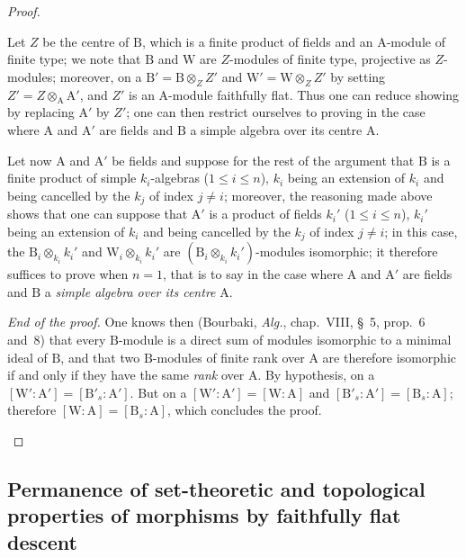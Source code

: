 \begin{proof}
\begin{env}[2.5.8.8]
Let $Z$ be the centre of $\mathrm{B}$, which is a finite product of fields and an $\mathrm{A}$-module of finite type; we note that $\mathrm{B}$ and $\mathrm{W}$ are
$Z$-modules of finite type, projective as $Z$-modules; moreover, on a $\mathrm{B}'=\mathrm{B}\otimes_Z Z'$ and $\mathrm{W}'=\mathrm{W}\otimes_Z Z'$ by setting
$Z'=Z\otimes_{\mathrm{A}}\mathrm{A}'$, and $Z'$ is an $\mathrm{A}$-module faithfully flat. Thus one can reduce showing  by replacing $\mathrm{A}'$ by $Z'$; one can then
restrict ourselves to proving  in the case where $\mathrm{A}$ and $\mathrm{A}'$ are fields and $\mathrm{B}$ a simple algebra over its centre $\mathrm{A}$.

Let now $\mathrm{A}$ and $\mathrm{A}'$ be fields and suppose for the rest of the argument that $\mathrm{B}$ is a finite product of simple $k_i$-algebras ($1\leq i\leq n$), $k_i$ being an extension of $k_i$ and being
cancelled by the $k_j$ of index $j\neq i$; moreover, the reasoning made above shows
that one can suppose that $\mathrm{A}'$ is a product of fields $k_i'$ ($1\leq i\leq n$), $k_i'$ being an extension of $k_i$ and being
cancelled by the $k_j$ of index $j\neq i$; in this case, the $\mathrm{B}_i\otimes_{k_i} k_i'$ and $\mathrm{W}_i\otimes_{k_i} k_i'$ are $(\mathrm{B}_i\otimes_{k_i} k_i')$-modules isomorphic; it therefore suffices to prove  when
$n=1$, that is to say in the case where $\mathrm{A}$ and $\mathrm{A}'$ are fields and $\mathrm{B}$ a \emph{simple algebra over its centre} $\mathrm{A}$.
\end{env}

\begin{env}[2.5.8.9]
\label{IV.2.5.8.9}
\emph{End of the proof.} One knows then (Bourbaki, \emph{Alg.}, chap.~VIII, \S~5, prop.~6 and~8) that every
$\mathrm{B}$-module is a direct sum of modules isomorphic to a minimal ideal of $\mathrm{B}$, and that two $\mathrm{B}$-modules of finite rank over
$\mathrm{A}$ are therefore isomorphic if and only if they have the same \emph{rank} over $\mathrm{A}$. By hypothesis, on a $[\mathrm{W}':\mathrm{A}']=[\mathrm{B}'_s:\mathrm{A}']$. But
on a $[\mathrm{W}':\mathrm{A}']=[\mathrm{W}:\mathrm{A}]$ and $[\mathrm{B}'_s:\mathrm{A}']= [\mathrm{B}_s:\mathrm{A}]$; therefore $[\mathrm{W}:\mathrm{A}]=[\mathrm{B}_s:\mathrm{A}]$, which concludes the proof.
\end{env}
\end{proof}


\subsection{Permanence of set-theoretic and topological properties of morphisms
by faithfully flat descent}
\label{subsection:IV.2.6}

